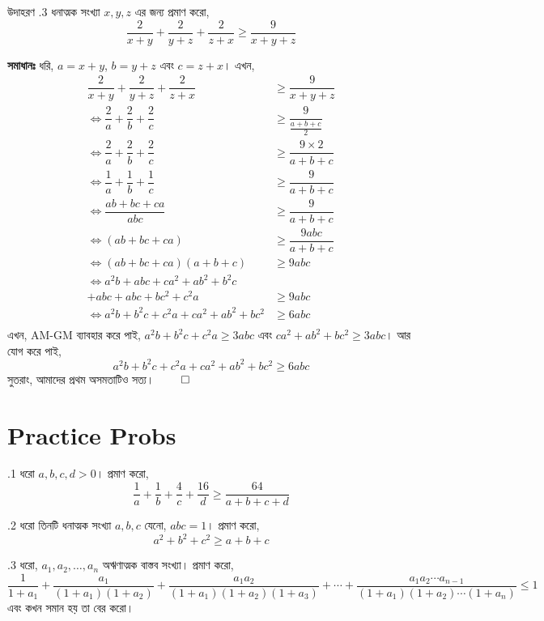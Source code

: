 \documentclass[12pt]{article}
\begin{document}
\begin{exam} {উদাহরণ \thesection.3}
    ধনাত্মক সংখ্যা $x,y,z$ এর জন্য প্রমাণ করো, 
    $$\dfrac{2}{x+y} + \dfrac{2}{y+z} + \dfrac{2}{z+x} \geq \dfrac{9}{x+y+z}$$
\end{exam}
\begin{sol}
    \textbf{সমাধানঃ} ধরি, $a = x+y$, $b = y+z$ এবং $c = z+x$। এখন, 
    \begin{align*}
        \dfrac{2}{x+y} + \dfrac{2}{y+z} + \dfrac{2}{z+x} &\geq \dfrac{9}{x+y+z}\\
        \iff \dfrac{2}{a} + \dfrac{2}{b} + \dfrac{2}{c} &\geq \dfrac{9}{\frac{a+b+c}{2}}\\
        \iff \dfrac{2}{a} + \dfrac{2}{b} + \dfrac{2}{c} &\geq \dfrac{9\times 2}{a+b+c}\\
        \iff \dfrac{1}{a} + \dfrac{1}{b} + \dfrac{1}{c} &\geq \dfrac{9}{a+b+c}\\
        \iff \dfrac{ab+bc+ca}{abc} &\geq \dfrac{9}{a+b+c}\\
        \iff (ab+bc+ca) &\geq \dfrac{9abc}{a+b+c}\\
        \iff (ab+bc+ca)(a+b+c) &\geq 9abc\\
        \iff a^2b+abc+ca^2+ab^2+b^2c\qquad &\\
        +abc + abc+bc^2+c^2a &\geq 9abc\\
        \iff a^2b+b^2c+c^2a +ca^2+ab^2  +bc^2 &\geq 6abc\\
    \end{align*}
    এখন, AM-GM ব্যাবহার করে পাই, $a^2b+b^2c+c^2a \geq 3abc$ এবং $ca^2+ab^2+bc^2 \geq 3abc$। আর 
    যোগ করে পাই, $$a^2b+b^2c+c^2a +ca^2+ab^2  +bc^2 \geq 6abc$$
    সুতরাং, আমাদের প্রথম অসমতাটিও সত্য। $\qed$
\end{sol}

\section{Practice Probs}
\begin{prob} {\thesection.1}
    ধরো $a,b,c,d > 0$। প্রমাণ করো, 
    $$\dfrac 1a + \dfrac 1b + \dfrac 4c + \dfrac {16}d \geq \dfrac{64}{a+b+c+d}$$
\end{prob}

\begin{prob} {\thesection.2}
    ধরো তিনটি ধনাত্মক সংখ্যা $a,b,c$ যেনো, $abc = 1$। প্রমাণ করো,
    $$a^2+b^2+c^2 \geq a+b+c$$
\end{prob}

\begin{prob} {\thesection.3}
    ধরো, $ a_1, a_2,\ldots, a_n$ অঋণাত্মক বাস্তব সংখ্যা। প্রমাণ করো,
    $$\frac{1}{1+ a_1}+\frac{ a_1}{(1+ a_1)(1+ a_2)}+\frac{ a_1 a_2}{(1+ a_1)(1+ a_2)(1+ a_3)}+\cdots+\frac{ a_1 a_2\cdots a_{n-1}}{(1+ a_1)(1+ a_2)\cdots (1+ a_n)} \leq 1 $$
    এবং কখন সমান হয় তা বের করো।
\end{prob}
\end{document}
